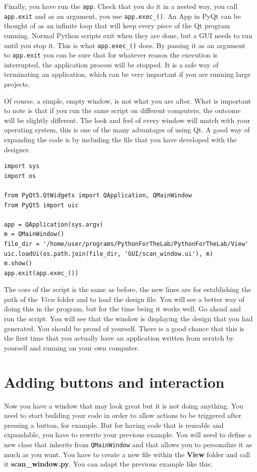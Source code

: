 Finally, you have run the \texttt{app}. Check that you do it in a nested
way, you call \texttt{app.exit} and as an argument, you use
\texttt{app.exec_()}. An App in PyQt can be thought of as an infinite
loop that will keep every piece of the Qt program running. Normal Python
scripts exit when they are done, but a {GUI} needs to run until you stop
it. This is what \texttt{app.exec_()} does. By passing it as an
argument to \texttt{app.exit} you can be sure that for whatever reason
the execution is interrupted, the application process will be stopped.
It is a safe way of terminating an application, which can be very
important if you are running large projects.

Of course, a simple, empty window, is not what you are after. What is
important to note is that if you run the same script on different
computers, the outcome will be slightly different. The look and feel of
every window will match with your operating system, this is one of the
many advantages of using Qt. A good way of expanding the code is by
including the file that you have developed with the designer.

\begin{verbatim}
import sys
import os

from PyQt5.QtWidgets import QApplication, QMainWindow
from PyQt5 import uic

app = QApplication(sys.argv)
m = QMainWindow()
file_dir = '/home/user/programs/PythonForTheLab/PythonForTheLab/View'
uic.loadUi(os.path.join(file_dir, 'GUI/scan_window.ui'), m)
m.show()
app.exit(app.exec_())
\end{verbatim}

The core of the script is the same as before, the new lines are for
establishing the path of the \emph{View} folder and to load the design
file. You will see a better way of doing this in the program, but for
the time being it works well. Go ahead and run the script. You will see
that the window is displaying the design that you had generated. You
should be proud of yourself. There is a good chance that this is the
first time that you actually have an application written from scratch by
yourself and running on your own computer.

\section{Adding buttons and interaction}\label{adding-buttons-andinteraction}
Now you have a window that may look great but it is not doing anything.
You need to start building your code in order to allow actions to be
triggered after pressing a button, for example. But for having code that
is reusable and expandable, you have to rewrite your previous example.
You will need to define a new class that inherits from
\texttt{QMainWindow} and that allows you to personalize it as much as
you want. You have to create a new file within the \textbf{View} folder
and call it \textbf{scan\_window.py}. You can adapt the previous example
like this:

